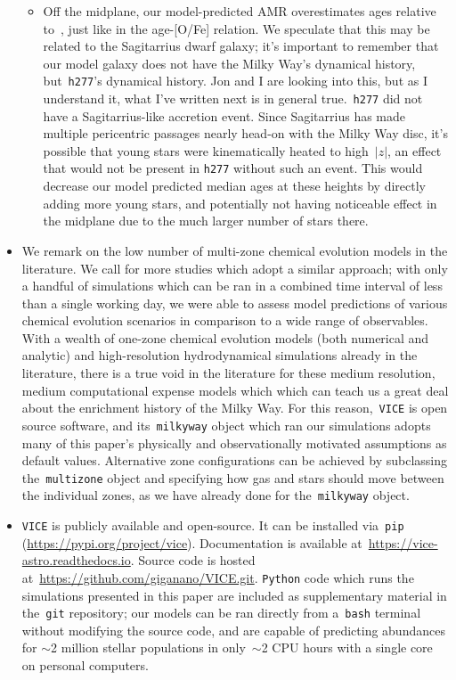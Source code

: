 \documentclass[fleqn, usenatbib]{mnras}
\begin{document}
\begin{itemize}
\begin{itemize}
		\item Off the midplane, our model-predicted AMR overestimates ages 
		relative to~\citet{Feuillet2019}, just like in the age-[O/Fe] relation. 
		We speculate that this may be related to the Sagitarrius dwarf 
		galaxy; it's important to remember that our model galaxy does not have 
		the Milky Way's dynamical history, but~\texttt{h277}'s dynamical 
		history. {\color{red} Jon and I are looking into this, but as I 
		understand it, what I've written next is in general true.}~\texttt{h277} 
		did not have a Sagitarrius-like accretion event. Since Sagitarrius 
		has made multiple pericentric passages nearly head-on with the Milky 
		Way disc, it's possible that young stars were kinematically heated to 
		high~$\left|z\right|$, an effect that would not be present in 
		\texttt{h277} without such an event. This would decrease our model 
		predicted median ages at these heights by directly adding more young 
		stars, and potentially not having noticeable effect in the midplane due 
		to the much larger number of stars there. 
	\end{itemize} 

	\item We remark on the low number of multi-zone 
	chemical evolution models in the literature. We call for more studies 
	which adopt a similar approach; with only a handful of simulations which 
	can be ran in a combined time interval of less than a single working day, 
	we were able to assess model predictions of various chemical evolution 
	scenarios in comparison to a wide range of observables. With a wealth of 
	one-zone chemical evolution models (both numerical and analytic) and 
	high-resolution hydrodynamical simulations already in the literature, 
	there is a true void in the literature for these medium resolution, medium 
	computational expense models which which can teach us a great deal about 
	the enrichment history of the Milky Way. For this reason,~\texttt{VICE} 
	is open source software, and its~\texttt{milkyway} object which ran our 
	simulations adopts many of this paper's physically and observationally 
	motivated assumptions as default values. Alternative zone configurations 
	can be achieved by subclassing the~\texttt{multizone} object and 
	specifying how gas and stars should move between the individual zones, as 
	we have already done for the~\texttt{milkyway} object. 

	\item \texttt{VICE} is publicly available and open-source. It can be 
	installed via~\texttt{pip} (\url{https://pypi.org/project/vice}). 
	Documentation is available at~\url{https://vice-astro.readthedocs.io}. 
	Source code is hosted at~\url{https://github.com/giganano/VICE.git}. 
	\texttt{Python} code which runs the simulations presented in this paper 
	are included as supplementary material in the~\texttt{git} repository; 
	our models can be ran directly from a~\texttt{bash} terminal without 
	modifying the source code, and are capable of predicting abundances for 
	$\sim$2 million stellar populations in only~$\sim$2 CPU hours with a 
	single core on personal computers. 
\end{itemize} 
\end{document}
